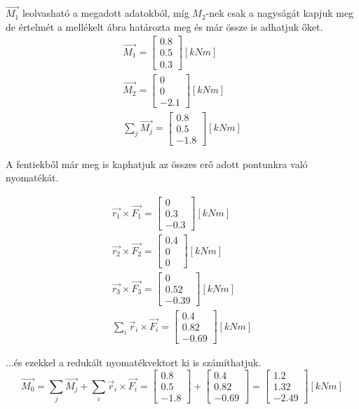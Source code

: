 $\vec{M_1}$ leolvasható a megadott adatokból, míg ${M_2}$-nek csak a nagyságát kapjuk meg de értelmét a mellékelt ábra határozta meg és már össze is adhatjuk őket.
\begin{align}
\vec{M_1} = \begin{bmatrix} 0.8 \\ 0.5 \\ 0.3 \end{bmatrix} [\si{kNm}] \\
\vec{M_2} = \begin{bmatrix} 0 \\ 0 \\ -2.1 \end{bmatrix} [\si{kNm}] \\
\sum_{j} \vec{M_j} = \begin{bmatrix} 0.8 \\ 0.5 \\ -1.8 \end{bmatrix} [\si{kNm}]
\end{align}

A fentiekből már meg is kaphatjuk az összes erő adott pontunkra való nyomatékát.

\begin{align}
\vec{r_1} \times \vec{F_1} = \begin{bmatrix} 0 \\ 0.3 \\ -0.3 \end{bmatrix} [\si{kNm}] \\
\vec{r_2} \times \vec{F_2} = \begin{bmatrix} 0.4 \\ 0 \\ 0 \end{bmatrix} [\si{kNm}] \\
\vec{r_3} \times \vec{F_3} = \begin{bmatrix} 0 \\ 0.52 \\ -0.39 \end{bmatrix} [\si{kNm}] \\
\sum_{i} \vec{r}_i \times \vec{F_i} = \begin{bmatrix} 0.4 \\ 0.82 \\ -0.69 \end{bmatrix} [\si{kNm}]
\end{align}

...és ezekkel a redukált nyomatékvektort ki is számíthatjuk.
$$\vec{M_0} = \sum_{j} \vec{M_j} + \sum_{i} \vec{r}_i \times \vec{F_i} = \begin{bmatrix} 0.8 \\ 0.5 \\ -1.8 \end{bmatrix} + \begin{bmatrix} 0.4 \\ 0.82 \\ -0.69 \end{bmatrix} = \begin{bmatrix} 1.2 \\ 1.32 \\ -2.49 \end{bmatrix} [\si{kNm}]$$

